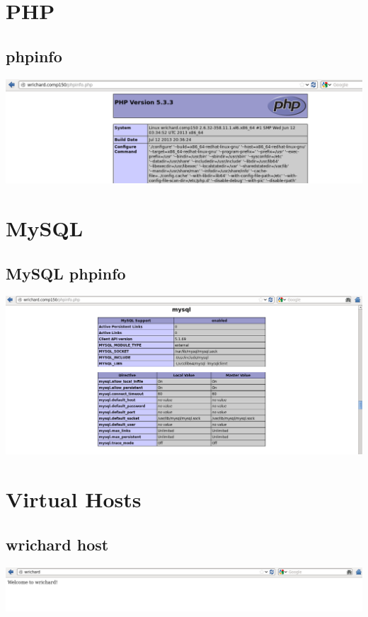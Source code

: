 \documentclass[a4paper,10pt]{article}
\begin{document}
\section{PHP}
\subsection{phpinfo}
\begin{center}
  \includegraphics[width=\linewidth]{./phpinfo.png}
  \end{center}

\section{MySQL}
\subsection{MySQL phpinfo}
\begin{center}
  \includegraphics[width=\linewidth]{./php_mysql.png}
  \end{center}

\section{Virtual Hosts}
\subsection{wrichard host}
\begin{center}
  \includegraphics[width=\linewidth]{./hello_wrichard.png}
  \end{center}
\end{document}

